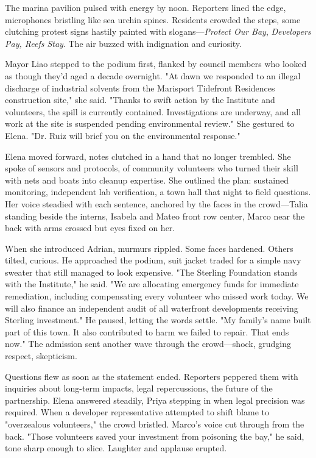 The marina pavilion pulsed with energy by noon. Reporters lined the edge, microphones bristling like sea urchin spines. Residents crowded the steps, some clutching protest signs hastily painted with slogans—\textit{Protect Our Bay}, \textit{Developers Pay, Reefs Stay}. The air buzzed with indignation and curiosity.

Mayor Liao stepped to the podium first, flanked by council members who looked as though they'd aged a decade overnight. "At dawn we responded to an illegal discharge of industrial solvents from the Marisport Tidefront Residences construction site," she said. "Thanks to swift action by the Institute and volunteers, the spill is currently contained. Investigations are underway, and all work at the site is suspended pending environmental review." She gestured to Elena. "Dr. Ruiz will brief you on the environmental response."

Elena moved forward, notes clutched in a hand that no longer trembled. She spoke of sensors and protocols, of community volunteers who turned their skill with nets and boats into cleanup expertise. She outlined the plan: sustained monitoring, independent lab verification, a town hall that night to field questions. Her voice steadied with each sentence, anchored by the faces in the crowd—Talia standing beside the interns, Isabela and Mateo front row center, Marco near the back with arms crossed but eyes fixed on her.

When she introduced Adrian, murmurs rippled. Some faces hardened. Others tilted, curious. He approached the podium, suit jacket traded for a simple navy sweater that still managed to look expensive. "The Sterling Foundation stands with the Institute," he said. "We are allocating emergency funds for immediate remediation, including compensating every volunteer who missed work today. We will also finance an independent audit of all waterfront developments receiving Sterling investment." He paused, letting the words settle. "My family's name built part of this town. It also contributed to harm we failed to repair. That ends now." The admission sent another wave through the crowd—shock, grudging respect, skepticism.

Questions flew as soon as the statement ended. Reporters peppered them with inquiries about long-term impacts, legal repercussions, the future of the partnership. Elena answered steadily, Priya stepping in when legal precision was required. When a developer representative attempted to shift blame to "overzealous volunteers," the crowd bristled. Marco's voice cut through from the back. "Those volunteers saved your investment from poisoning the bay," he said, tone sharp enough to slice. Laughter and applause erupted.

